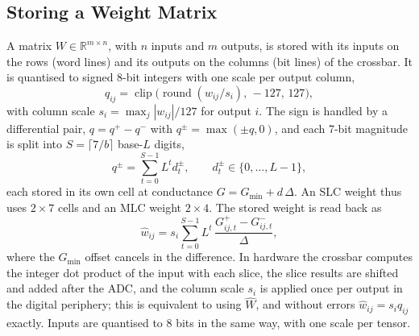 \subsection{Storing a Weight Matrix}
A matrix $W\in\mathbb R^{m\times n}$, with $n$ inputs and $m$ outputs, is stored with its inputs on the rows
(word lines) and its outputs on the columns (bit lines) of the crossbar. It is quantised to signed 8-bit
integers with one scale per output column,
\begin{equation}
q_{ij}=\operatorname{clip}\!\big(\operatorname{round}(w_{ij}/s_i),\,-127,\,127\big),
\label{eq:quant}
\end{equation}
with column scale $s_i=\max_j|w_{ij}|/127$ for output $i$.
The sign is handled by a differential pair, $q=q^{+}-q^{-}$ with $q^{\pm}=\max(\pm q,0)$, and each
7-bit magnitude is split into $S=\lceil 7/b\rceil$ base-$L$ digits,
\begin{equation}
q^{\pm}=\sum_{t=0}^{S-1}L^{t}d_t^{\pm},\qquad d_t^{\pm}\in\{0,\dots,L-1\},
\label{eq:slice}
\end{equation}
each stored in its own cell at conductance $G=G_{\min}+d\,\Delta$. An SLC weight thus uses $2\times7$
cells and an MLC weight $2\times4$. The stored weight is read back as
\begin{equation}
\hat w_{ij}=s_i\sum_{t=0}^{S-1}L^{t}\,\frac{G^{+}_{ij,t}-G^{-}_{ij,t}}{\Delta},
\label{eq:readback}
\end{equation}
where the $G_{\min}$ offset cancels in the difference. In hardware the crossbar computes the integer dot
product of the input with each slice, the slice results are shifted and added after the ADC, and the
column scale $s_i$ is applied once per output in the digital periphery; this is equivalent to using
$\hat W$, and without errors $\hat w_{ij}=s_iq_{ij}$ exactly. Inputs are quantised to 8 bits in the same
way, with one scale per tensor.


